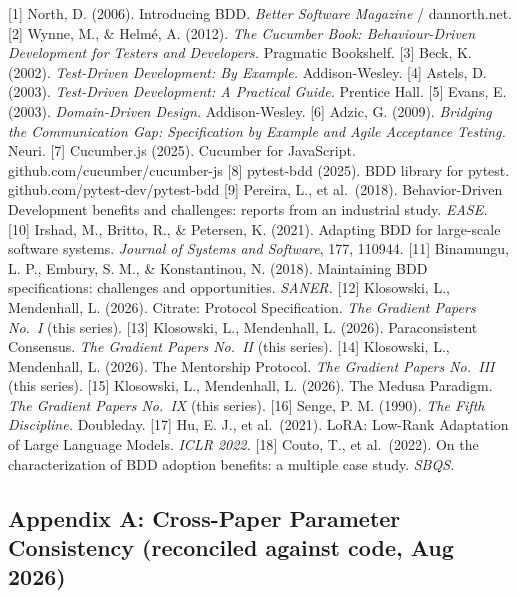 {[}1{]} North, D. (2006). Introducing BDD. \emph{Better Software
Magazine} / dannorth.net. {[}2{]} Wynne, M., \& Helmé, A. (2012).
\emph{The Cucumber Book: Behaviour-Driven Development for Testers and
Developers.} Pragmatic Bookshelf. {[}3{]} Beck, K. (2002).
\emph{Test-Driven Development: By Example.} Addison-Wesley. {[}4{]}
Astels, D. (2003). \emph{Test-Driven Development: A Practical Guide.}
Prentice Hall. {[}5{]} Evans, E. (2003). \emph{Domain-Driven Design.}
Addison-Wesley. {[}6{]} Adzic, G. (2009). \emph{Bridging the
Communication Gap: Specification by Example and Agile Acceptance
Testing.} Neuri. {[}7{]} Cucumber.js (2025). Cucumber for JavaScript.
github.com/cucumber/cucumber-js {[}8{]} pytest-bdd (2025). BDD library
for pytest. github.com/pytest-dev/pytest-bdd {[}9{]} Pereira, L., et
al.~(2018). Behavior-Driven Development benefits and challenges: reports
from an industrial study. \emph{EASE.} {[}10{]} Irshad, M., Britto, R.,
\& Petersen, K. (2021). Adapting BDD for large-scale software systems.
\emph{Journal of Systems and Software}, 177, 110944. {[}11{]} Binamungu,
L. P., Embury, S. M., \& Konstantinou, N. (2018). Maintaining BDD
specifications: challenges and opportunities. \emph{SANER.} {[}12{]}
Klosowski, L., Mendenhall, L. (2026). Citrate: Protocol Specification.
\emph{The Gradient Papers No.~I} (this series). {[}13{]} Klosowski, L.,
Mendenhall, L. (2026). Paraconsistent Consensus. \emph{The Gradient
Papers No.~II} (this series). {[}14{]} Klosowski, L., Mendenhall, L.
(2026). The Mentorship Protocol. \emph{The Gradient Papers No.~III}
(this series). {[}15{]} Klosowski, L., Mendenhall, L. (2026). The Medusa
Paradigm. \emph{The Gradient Papers No.~IX} (this series). {[}16{]}
Senge, P. M. (1990). \emph{The Fifth Discipline.} Doubleday. {[}17{]}
Hu, E. J., et al.~(2021). LoRA: Low-Rank Adaptation of Large Language
Models. \emph{ICLR 2022.} {[}18{]} Couto, T., et al.~(2022). On the
characterization of BDD adoption benefits: a multiple case study.
\emph{SBQS.}

\subsection{Appendix A: Cross-Paper Parameter Consistency (reconciled
against code, Aug
2026)}\label{appendix-a-cross-paper-parameter-consistency-reconciled-against-code-aug-2026}

